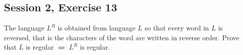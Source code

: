 \subsection{Session 2, Exercise 13}


The language $L^R$ is obtained from language $L$ so that every word in $L$ is reversed, that is the characters of the word are written in reverse order. Prove that $L$ is regular $\Leftrightarrow$ $L^R$ is regular.

